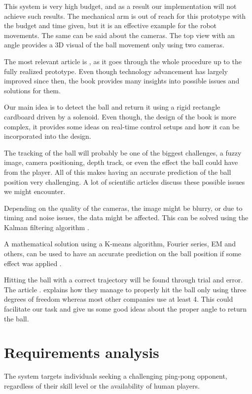 This system is very high budget, and as a result our implementation will not achieve such results. The mechanical arm is out of reach for this prototype with the budget and time given, but it is an effective example for the robot movements. The same can be said about the cameras. The top view with an angle provides a 3D visual of the ball movement only using two cameras.

The most relevant article is \cite{Acosta2004}, as it goes through the whole procedure up to the fully realized prototype. Even though technology advancement has largely improved since then, the book provides many insights into possible issues and solutions for them.

Our main idea is to detect the ball and return it using a rigid rectangle cardboard driven by a solenoid. Even though, the design of the book \cite{Yu2012} is more complex, it provides some ideas on real-time control setups and how it can be incorporated into the design.

The tracking of the ball will probably be one of the biggest challenges, a fuzzy image, camera positioning, depth track, or even the effect the ball could have from the player. All of this makes having an accurate prediction of the ball position very challenging. A lot of scientific articles discuss these possible issues we might encounter.

Depending on the quality of the cameras, the image might be blurry, or due to timing and noise issues, the data might be affected. This can be solved using the Kalman filtering algorithm \cite{Lu2020}.

A mathematical solution using a K-means algorithm, Fourier series, EM and others, can be used to have an accurate prediction on the ball position if some effect was applied  \cite{Zhao2017}.

Hitting the ball with a correct trajectory will be found through trial and error. The article \cite{Trasloheros2014}. explains how they manage to properly hit the ball only using three degrees of freedom whereas most other companies use at least 4. This could facilitate our task and give us some good ideas about the proper angle to return the ball.


\section{Requirements analysis}

The system targets individuals seeking a challenging ping-pong opponent, regardless of their skill level or the availability of human players.

